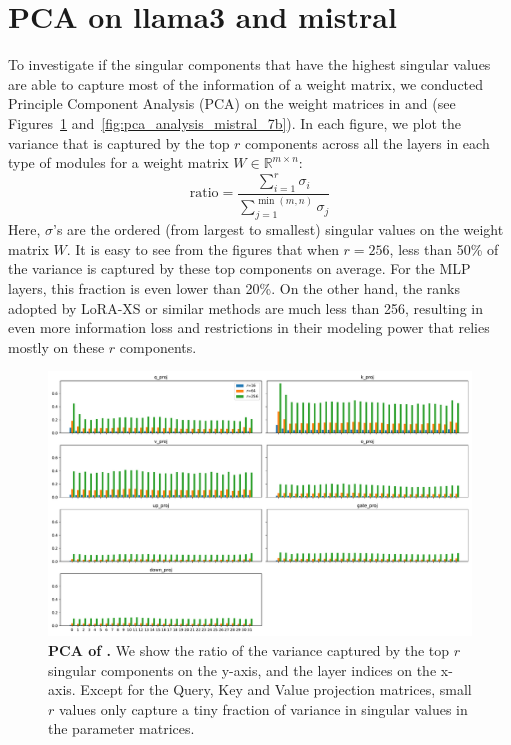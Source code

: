 \section{PCA on llama3 and mistral}
\label{app:sec:pca}

To investigate if the singular components that have the highest singular values are able to capture most of the information of a weight matrix, we conducted Principle Component Analysis (PCA) on the weight matrices in \llama and \mistral (see Figures~\ref{fig:pca_analysis_llama3_8b} and~\ref{fig:pca_analysis_mistral_7b}).
In each figure, we plot the variance that is captured by the top $r$ components across all the layers in each type of modules for a weight matrix $W \in \mathbb{R}^{m \times n}$:
$$\text{ratio} = \frac{\sum_{i=1}^r \sigma_i}{\sum_{j=1}^{\min(m, n)} \sigma_j}$$
Here, $\sigma$'s are the ordered (from largest to smallest) singular values on the weight matrix $W$.
It is easy to see from the figures that when $r=256$, less than 50\% of the variance is captured by these top components on average.
For the MLP layers, this fraction is even lower than 20\%.
On the other hand, the ranks adopted by LoRA-XS or similar methods are much less than 256, resulting in even more information loss and restrictions in their modeling power that relies mostly on these $r$ components.


\begin{figure}[!h]
    \centering
    \includegraphics[width=\textwidth]{images/pca_analysis_llama3-8b.pdf}
    \vspace{-6mm}
    \caption{\textbf{PCA of \llama.} We show the ratio of the variance captured by the top $r$ singular components on the y-axis, and the layer indices on the x-axis. Except for the Query, Key and Value projection matrices, small $r$ values only capture a tiny fraction of variance in singular values in the parameter matrices.}
    \vspace{-4mm}
    \label{fig:pca_analysis_llama3_8b}
\end{figure}


